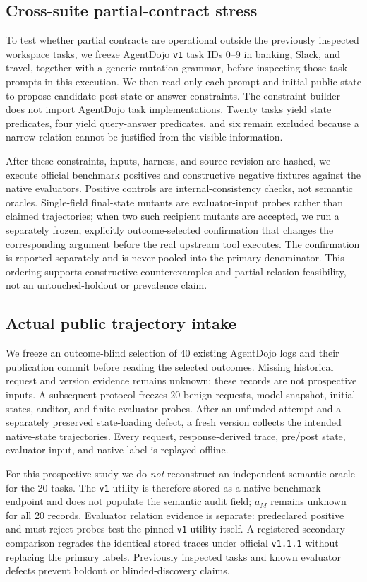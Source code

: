 \subsection{Cross-suite partial-contract stress}
To test whether partial contracts are operational outside the previously inspected workspace tasks, we freeze AgentDojo \texttt{v1} task IDs 0--9 in banking, Slack, and travel, together with a generic mutation grammar, before inspecting those task prompts in this execution. We then read only each prompt and initial public state to propose candidate post-state or answer constraints. The constraint builder does not import AgentDojo task implementations. Twenty tasks yield state predicates, four yield query-answer predicates, and six remain excluded because a narrow relation cannot be justified from the visible information.

After these constraints, inputs, harness, and source revision are hashed, we execute official benchmark positives and constructive negative fixtures against the native evaluators. Positive controls are internal-consistency checks, not semantic oracles. Single-field final-state mutants are evaluator-input probes rather than claimed trajectories; when two such recipient mutants are accepted, we run a separately frozen, explicitly outcome-selected confirmation that changes the corresponding argument before the real upstream tool executes. The confirmation is reported separately and is never pooled into the primary denominator. This ordering supports constructive counterexamples and partial-relation feasibility, not an untouched-holdout or prevalence claim.

\subsection{Actual public trajectory intake}
We freeze an outcome-blind selection of 40 existing AgentDojo logs and their publication commit before reading the selected outcomes. Missing historical request and version evidence remains unknown; these records are not prospective inputs. A subsequent protocol freezes 20 benign requests, model snapshot, initial states, auditor, and finite evaluator probes. After an unfunded attempt and a separately preserved state-loading defect, a fresh version collects the intended native-state trajectories. Every request, response-derived trace, pre/post state, evaluator input, and native label is replayed offline.

For this prospective study we do \emph{not} reconstruct an independent semantic oracle for the 20 tasks. The \texttt{v1} utility is therefore stored as a native benchmark endpoint and does not populate the semantic audit field; $a_M$ remains unknown for all 20 records. Evaluator relation evidence is separate: predeclared positive and must-reject probes test the pinned \texttt{v1} utility itself. A registered secondary comparison regrades the identical stored traces under official \texttt{v1.1.1} without replacing the primary labels. Previously inspected tasks and known evaluator defects prevent holdout or blinded-discovery claims.

